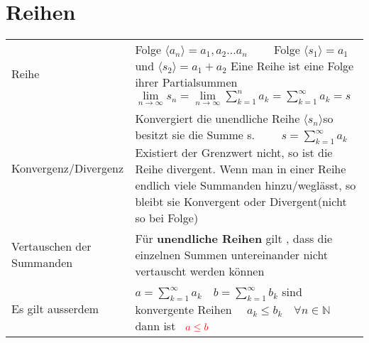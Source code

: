 \clearpage

\begin{table}[h!]
\section{Reihen}

\begin{center}

\begin{tabularx}{540pt}{|p{100pt}|X|}
\hline
\rowcolor{Gray}
\multicolumn{2}{|c|}{\textbf{Grundlegendes}}\\
\hline

	Reihe & 
	Folge $\langle a_n \rangle = a_1,a_2...a_n \qquad$
	Folge $\langle s_1\rangle = a_1$ und $\langle s_2 \rangle = a_1+a_2$\newline
	Eine Reihe ist eine Folge ihrer Partialsummen $\lim\limits_{n\to\infty} s_n  =  \lim\limits_{n\to\infty}\sum\limits_{k=1}^{n}a_k = \sum\limits_{k=1}^{\infty}a_k = s$\\
\hline
	Konvergenz/Divergenz &
	Konvergiert die unendliche Reihe $\langle s_n\rangle $so besitzt sie die Summe s. $\qquad
	s=\sum\limits_{k=1}^{\infty} a_k$\newline
	Existiert der Grenzwert nicht, so ist die Reihe divergent.\newline
	Wenn man in einer Reihe endlich viele Summanden hinzu/weglässt, so bleibt sie Konvergent oder Divergent(nicht so bei Folge)\\
\hline
	Vertauschen \newline der Summanden &
	Für \textbf{unendliche Reihen} gilt , dass die einzelnen Summen untereinander {\color{red}nicht} vertauscht werden können\\
\hline
	Es gilt ausserdem&
	$a=\sum\limits_{k=1}^{\infty} a_k \quad b=\sum\limits_{k=1}^{\infty} b_k$ sind konvergente Reihen $\quad a_k \leq b_k\quad \forall n\in \mathbb{N} \qquad $dann ist$\quad {\color{red}a\leq b}$\\
	\hline
\end{tabularx}

\begin{tabularx}{540pt}{|p{100pt}|X|}
\hline
\rowcolor{Gray}
\multicolumn{2}{|c|}{\textbf{Konvergenzkriterien}}\\
\hline


\end{tabularx}
\end{center}
\end{table}
